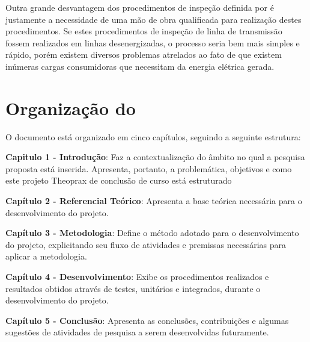  Outra grande desvantagem dos procedimentos de inspeção definida por \cite{cinematicajuliana} é justamente a necessidade de uma mão de obra qualificada para realização destes procedimentos. Se estes procedimentos de inspeção de linha de transmissão fossem realizados em linhas desenergizadas, o processo seria bem mais simples e rápido, porém existem diversos problemas atrelados ao fato de que existem inúmeras cargas consumidoras que necessitam da energia elétrica gerada.


\section{Organização do \thetypework}
\label{section:organizacao}
O documento está organizado em cinco capítulos, seguindo a seguinte estrutura:

\textbf{Capitulo 1 - Introdução}: Faz a contextualização do âmbito no qual a pesquisa proposta
está inserida. Apresenta, portanto, a problemática, objetivos e como este projeto Theoprax de conclusão de curso está estruturado


\textbf{Capítulo 2 - Referencial Teórico}: Apresenta a base teórica necessária para o desenvolvimento do projeto.

\textbf{Capítulo 3 - Metodologia}: Define o método adotado para o desenvolvimento do projeto, explicitando seu fluxo de atividades e premissas necessárias para aplicar a metodologia.

\textbf{Capítulo 4 - Desenvolvimento}: Exibe os procedimentos realizados e resultados obtidos através de testes, unitários e integrados, durante o desenvolvimento do projeto.

\textbf{Capítulo 5 - Conclusão}: Apresenta as conclusões, contribuições e algumas sugestões de atividades de pesquisa a serem desenvolvidas futuramente.


